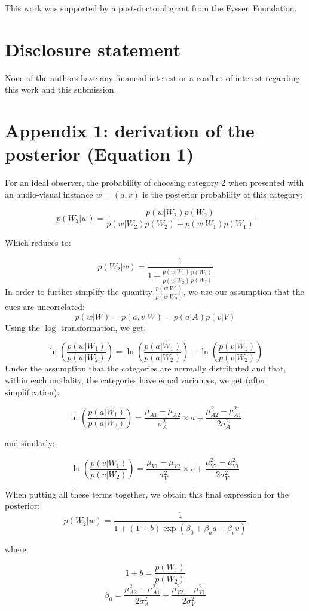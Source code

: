 \documentclass[english,,man,floatsintext]{apa6}
\theoremstyle{definition}
\theoremstyle{definition}
\theoremstyle{definition}
\theoremstyle{remark}
\begin{document}
This work was supported by a post-doctoral grant from the Fyssen
Foundation.

\section{Disclosure statement}\label{disclosure-statement}

None of the authors have any financial interest or a conflict of
interest regarding this work and this submission.

\section{Appendix 1: derivation of the posterior (Equation
1)}\label{appendix-1-derivation-of-the-posterior-equation-1}

For an ideal observer, the probability of choosing category 2 when
presented with an audio-visual instance \(w = (a, v)\) is the posterior
probability of this category:

\[p(W_2 | w)=\frac{p(w|W_2)p(W_2)}{p(w|W_2)p(W_2)+p(w|W_1)p(W_1)}\]

Which reduces to:

\[p(W_2 | w)=\frac{1}{1+\frac{p(w|W_1)}{p(w|W_2)} \frac{p(W_1)}{p(W_2)}}\]
In order to further simplify the quantity \(\frac{p(w|W_1)}{p(w|W_2)}\),
we use our assumption that the cues are uncorrelated:
\[p(w | W) = p(a,v| W) = p(a| A)p(v| V)\] Using the \(\log\)
transformation, we get:

\[ \ln(\frac{p(w |W_1)}{p(w|W_2)})=\ln(\frac{p(a|W_1)}{p(a|W_2)})+\ln(\frac{p(v|W_1)}{p(v|W_2)}) \]
Under the assumption that the categories are normally distributed and
that, within each modality, the categories have equal variances, we get
(after simplification):

\[\ln(\frac{p(a|W_1)}{p(a|W_2)})=\frac{\mu_{A1}-\mu_{A2}}{\sigma^2_{A}}\times a+ \frac{\mu^2_{A2}-\mu^2_{A1}}{2\sigma^2_{A}}\]

and similarly:

\[\ln(\frac{p(v|W_1)}{p(v|W_2)})=\frac{\mu_{V1}-\mu_{V2}}{\sigma^2_{V}}\times v+ \frac{\mu^2_{V2}-\mu^2_{V1}}{2\sigma^2_{V}}\]

When putting all these terms together, we obtain this final expression
for the posterior:
\[p(W_2 | w)=\frac{1}{1+(1+b)\exp(\beta_0+\beta_aa+\beta_vv)}\]

where

\[1+b=\frac{p(W_1)}{p(W_2)}\]
\[\beta_0=\frac{\mu^2_{A2}-\mu^2_{A1}}{2\sigma^2_{A}}+\frac{\mu^2_{V2}-\mu^2_{V1}}{2\sigma^2_{V}}\]
\end{document}
